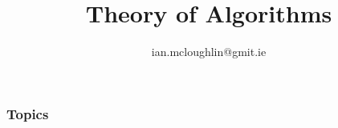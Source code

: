 \documentclass[dvipsnames]{beamer}
\begin{document}
  \title{Theory of Algorithms}
  \subtitle{}
  \author{ian.mcloughlin@gmit.ie}
  \date{}

  \begin{frame}
    \titlepage
  \end{frame}

  \begin{frame}
    \frametitle{Topics}
    \tableofcontents
  \end{frame}

  
  
  
  
\end{document}
